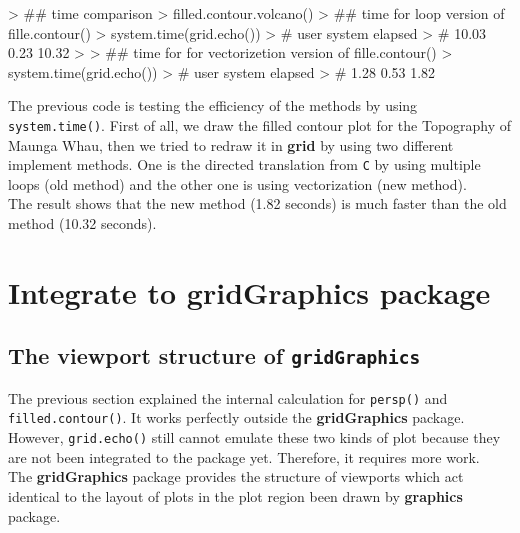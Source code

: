 \documentclass[11pt]{report}
\begin{document}
\begin{Schunk}
\begin{Sinput}
> ## time comparison
> filled.contour.volcano()
> ## time for loop version of fille.contour()
> system.time(grid.echo())
> # user  system elapsed 
> # 10.03    0.23   10.32 
> 
> ## time for for vectorizetion version of fille.contour()
> system.time(grid.echo())
> # user  system elapsed 
> # 1.28    0.53    1.82 
\end{Sinput}
\end{Schunk}


	The previous code is testing the efficiency of the methods by using \texttt{system.time()}. First of all, we draw the filled contour plot for the Topography of Maunga Whau, then we tried to redraw it in \textbf{grid} by using two different implement methods. One is the directed translation from \texttt{C} by using multiple loops (old method) and the other one is using vectorization (new method).\\
	The result shows that the new method (1.82 seconds) is much faster than the old method (10.32 seconds).

\chapter{Integrate to \textbf{gridGraphics} package}
\section{The viewport structure of \texttt{gridGraphics}}
The previous section explained the internal calculation for \texttt{persp()} and \texttt{filled.contour()}. It works perfectly outside the \textbf{gridGraphics} package. However, \texttt{grid.echo()} still cannot emulate these two kinds of plot because they are not been integrated to the package yet. Therefore, it requires more work.\\ 

The \textbf{gridGraphics} package provides the structure of viewports which act identical to the layout of plots in the plot region been drawn by \textbf{graphics} package. \\
\end{document}
